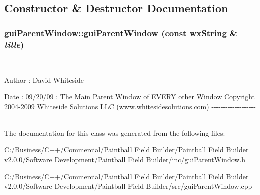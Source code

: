 \subsection{Constructor \& Destructor Documentation}
\hypertarget{classgui_parent_window_a665e8aa86c3245a4c12009a4be92e2dd}{
\subsubsection[{guiParentWindow}]{\setlength{\rightskip}{0pt plus 5cm}guiParentWindow::guiParentWindow (const wxString \& {\em title})}}
\label{classgui_parent_window_a665e8aa86c3245a4c12009a4be92e2dd}
-\/-\/-\/-\/-\/-\/-\/-\/-\/-\/-\/-\/-\/-\/-\/-\/-\/-\/-\/-\/-\/-\/-\/-\/-\/-\/-\/-\/-\/-\/-\/-\/-\/-\/-\/-\/-\/-\/-\/-\/-\/-\/-\/-\/-\/-\/-\/-\/-\/-\/-\/-\/-\/-\/-\/-\/-\/ \begin{DoxyAuthor}{Author}
: David Whiteside 
\end{DoxyAuthor}
\begin{DoxyDate}{Date}
: 09/20/09 : The Main Parent Window of EVERY other Window Copyright 2004-\/2009 Whiteside Solutions LLC (www.whitesidesolutions.com) -\/-\/-\/-\/-\/-\/-\/-\/-\/-\/-\/-\/-\/-\/-\/-\/-\/-\/-\/-\/-\/-\/-\/-\/-\/-\/-\/-\/-\/-\/-\/-\/-\/-\/-\/-\/-\/-\/-\/-\/-\/-\/-\/-\/-\/-\/-\/-\/-\/-\/-\/-\/-\/-\/-\/-\/-\/ 
\end{DoxyDate}


The documentation for this class was generated from the following files:\begin{DoxyCompactItemize}
\item 
C:/Business/C++/Commercial/Paintball Field Builder/Paintball Field Builder v2.0.0/Software Development/Paintball Field Builder/inc/guiParentWindow.h\item 
C:/Business/C++/Commercial/Paintball Field Builder/Paintball Field Builder v2.0.0/Software Development/Paintball Field Builder/src/guiParentWindow.cpp\end{DoxyCompactItemize}
